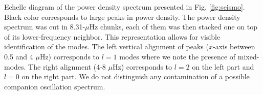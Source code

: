 \label{fig:echelle}  Echelle diagram of the power density spectrum presented in Fig. \ref{fig:seismo}. Black color corresponds to large peaks in power density. The power density spectrum was cut in 8.31-$\mu$Hz chunks, each of them was then stacked one on top of its lower-frequency neighbor. This representation allows for visible identification of the modes. The left vertical alignment of peaks ($x$-axis between 0.5 and 4 $\mu$Hz) corresponds to $l=1$ modes where we note the presence of mixed-modes. The right alignment (4-8 $\mu$Hz) corresponds to $l=2$ on the left part and $l=0$ on the right part. We do not distinguish any contamination of a possible companion oscillation spectrum. 
  
  
  
  